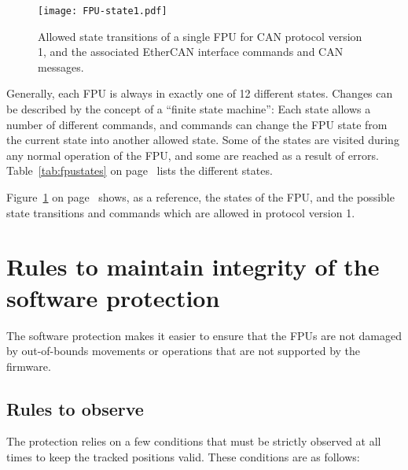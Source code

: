 \documentclass[11pt,a4paper]{scrartcl}
\begin{document}
\begin{figure}
  \texttt{[image: FPU-state1.pdf]}
  \caption{Allowed state transitions of a single FPU for CAN protocol
    version 1, and the associated EtherCAN interface commands and CAN messages.}
  \label{fig:states}
\end{figure}


Generally, each FPU is always in exactly one of 12 different states.
Changes can be described by the concept of a ``finite state machine'':
Each state allows a number of different commands, and commands can
change the FPU state from the current state into another allowed
state.  Some of the states are visited during any normal operation of
the FPU, and some are reached as a result of errors.
Table~\ref{tab:fpustates} on page~\pageref{tab:fpustates} lists the
different states.


Figure~\ref{fig:states} on page~\pageref{fig:states} shows, as a
reference, the states of the FPU, and the possible state transitions
and commands which are allowed in protocol version 1.


\section{Rules to maintain integrity of the software protection}
\label{sec:protectionrules}

The software protection makes it easier to ensure that the FPUs are
not damaged by out-of-bounds movements or operations that are not
supported by the firmware.

\subsection{Rules to observe}
The protection relies on a few conditions that must be strictly
observed at all times to keep the tracked positions valid. These
conditions are as follows:
\end{document}
